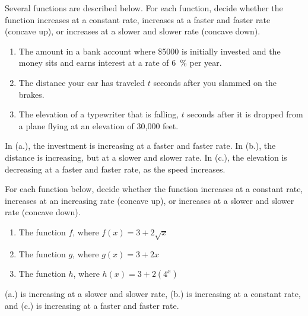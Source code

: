 \begin{problem}
\begin{subproblem}
	Several functions are described below.  For each function, decide whether the function 
	increases at a constant rate, increases at a faster and faster rate (concave up), or increases at a slower and slower rate (concave down).
	\begin{enumerate}
		\item The amount in a bank account where \$5000 is initially invested and the money sits 
		and earns interest at a rate of \SI{6}{\percent} per year.
		\item The distance your car has traveled $t$ seconds after you slammed on the brakes.
		\item The elevation of a typewriter that is falling, $t$ seconds after it is dropped from a plane flying at an 
		elevation of 30,000 feet.
	\end{enumerate}
	\begin{shortsolution}
		In (a.), the investment is increasing at a faster and faster rate.  In (b.), the distance is
		increasing, but at a slower and slower rate.  In (c.), the elevation is decreasing at a faster and faster rate, as
		the speed increases.
	\end{shortsolution}
\end{subproblem}
\begin{subproblem}
	For each function below, decide whether the function increases at a constant rate, increases at an 
	increasing rate (concave up), or increases at a slower and slower rate (concave down).
	\begin{enumerate}
		\item The function $f$, where $f(x)=3+2\sqrt{x}$
		\item The function $g$, where $g(x)=3+2x$
		\item The function $h$, where $h(x)=3+2(4^x)$
	\end{enumerate}
	\begin{shortsolution}
		(a.) is increasing at a slower and slower rate, (b.) is increasing at a constant rate, and (c.) is 
		increasing at a faster and faster rate.
	\end{shortsolution}
\end{subproblem}
\end{problem}

